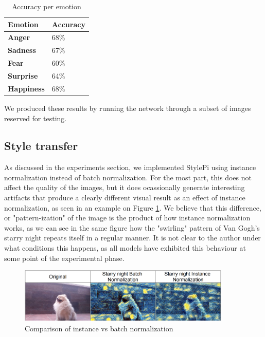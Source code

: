 \begin{table}[h]
    \centering
    \begin{tabular}{ll}
        \hline
        \textbf{Emotion}   & \textbf{Accuracy} \\ \hline
        \textbf{Anger}     & 68\%              \\
        \textbf{Sadness}   & 67\%              \\
        \textbf{Fear}      & 60\%              \\
        \textbf{Surprise}  & 64\%              \\
        \textbf{Happiness} & 68\%              \\ \hline
    \end{tabular}
    \caption{Accuracy per emotion}
    \label{tab:acc_per_emotion}
\end{table}

We produced these results by running the network through a subset of images reserved for testing.

\subsection{Style transfer}


As discussed in the experiments section, we implemented StylePi using instance normalization instead of batch normalization. For the most part, this does not affect the quality of the images, but it does ocassionally generate interesting artifacts that produce a clearly different visual result as an effect of instance normalization, as seen in an example on Figure \ref{fig:style_norm_comp}. We believe that this difference, or "pattern-ization" of the image is the product of how instance normalization works, as we can see in the same figure how the "swirling" pattern of Van Gogh's starry night repeats itself in a regular manner. It is not clear to the author under what conditions this happens, as all models have exhibited this behaviour at some point of the experimental phase.


\begin{figure}[h]
    \centering
    \includegraphics[width = 0.9\textwidth]{resources/style_norm_comp.png}
    \caption{Comparison of instance vs batch normalization}\label{fig:style_norm_comp}
\end{figure}

